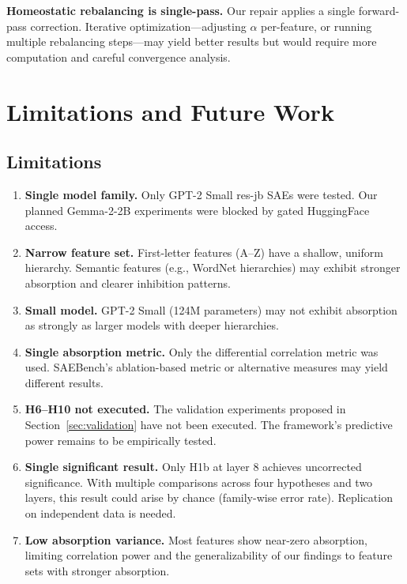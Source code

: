 \documentclass{article}
\begin{document}
\textbf{Homeostatic rebalancing is single-pass.} Our repair applies a single forward-pass correction. Iterative optimization---adjusting $\alpha$ per-feature, or running multiple rebalancing steps---may yield better results but would require more computation and careful convergence analysis.

\section{Limitations and Future Work}
\label{sec:limitations}

\subsection{Limitations}

\begin{enumerate}
    \item \textbf{Single model family.} Only GPT-2 Small res-jb SAEs were tested. Our planned Gemma-2-2B experiments were blocked by gated HuggingFace access.
    \item \textbf{Narrow feature set.} First-letter features (A--Z) have a shallow, uniform hierarchy. Semantic features (e.g., WordNet hierarchies) may exhibit stronger absorption and clearer inhibition patterns.
    \item \textbf{Small model.} GPT-2 Small (124M parameters) may not exhibit absorption as strongly as larger models with deeper hierarchies.
    \item \textbf{Single absorption metric.} Only the \citet{chanin2024quantifying} differential correlation metric was used. SAEBench's ablation-based metric or alternative measures may yield different results.
    \item \textbf{H6--H10 not executed.} The validation experiments proposed in Section~\ref{sec:validation} have not been executed. The framework's predictive power remains to be empirically tested.
    \item \textbf{Single significant result.} Only H1b at layer 8 achieves uncorrected significance. With multiple comparisons across four hypotheses and two layers, this result could arise by chance (family-wise error rate). Replication on independent data is needed.
    \item \textbf{Low absorption variance.} Most features show near-zero absorption, limiting correlation power and the generalizability of our findings to feature sets with stronger absorption.
\end{enumerate}
\end{document}
